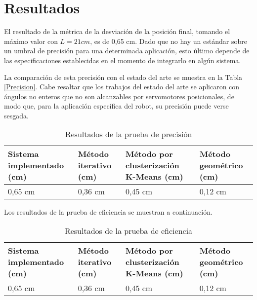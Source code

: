 \section{Resultados}

El resultado de la métrica de la desviación de la posición final, tomando el máximo valor con $L = 21 cm$, es de 0,65 cm. Dado que no hay un estándar sobre un umbral de precisión para una determinada aplicación, esto último depende de las especificaciones establecidas en el momento de integrarlo en algún sistema.

La comparación de esta precisión con el estado del arte se muestra en la Tabla \ref{Precision}. Cabe resaltar que los trabajos del estado del arte se aplicaron con ángulos no enteros que no son alcanzables por servomotores posicionales, de modo que, para la aplicación específica del robot, su precisión puede verse sesgada.

\begin{table}[ht]
	\centering
	\begin{tabular}{p{5cm}p{4cm}p{3.6cm}p{4cm}}
		\hline
		\textbf{Sistema implementado (cm)} & \textbf{Método iterativo (cm)} & \textbf{Método por clusterización K-Means (cm)} & \textbf{Método geométrico (cm)} \\
		\hline
		0,65 cm & 0,36 cm & 0,45 cm & 0,12 cm \\
		\hline
	\end{tabular}
	\caption{Resultados de la prueba de precisión}
	\label{tab:Precision}
\end{table}

Los resultados de la prueba de eficiencia se muestran a continuación.

\begin{table}[ht]
	\centering
	\begin{tabular}{p{5cm}p{4cm}p{3.6cm}p{4cm}}
		\hline
		\textbf{Sistema implementado (cm)} & \textbf{Método iterativo (cm)} & \textbf{Método por clusterización K-Means (cm)} & \textbf{Método geométrico (cm)} \\
		\hline
		0,65 cm & 0,36 cm & 0,45 cm & 0,12 cm \\
		\hline
	\end{tabular}
	\caption{Resultados de la prueba de eficiencia}
	\label{tab:Precision}
\end{table}